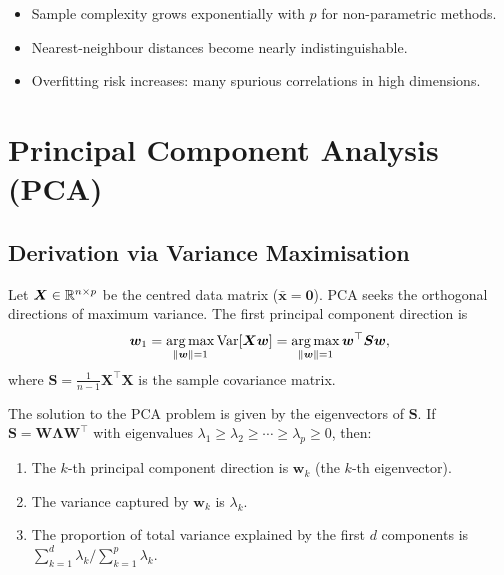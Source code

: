 \begin{warning}[title=\textbf{Practical Consequences}]
\begin{itemize}
  \item Sample complexity grows exponentially with $p$ for non-parametric methods.
  \item Nearest-neighbour distances become nearly indistinguishable.
  \item Overfitting risk increases: many spurious correlations in high dimensions.
\end{itemize}
\end{warning}

\section{Principal Component Analysis (PCA)}

\subsection{Derivation via Variance Maximisation}

\begin{definition}[PCA]
Let $\bm{X}\in\mathbb{R}^{n\times p}$ be the centred data matrix ($\bar{\bm{x}}=\bm{0}$). PCA seeks the orthogonal directions of maximum variance. The first principal component direction is
\[
  \bm{w}_1 = \operatorname*{arg\,max}_{\left\| \bm{w} \right\|=1} \mathrm{Var}[\bm{X}\bm{w}]
  = \operatorname*{arg\,max}_{\left\| \bm{w} \right\|=1} \bm{w}^\top\bm{S}\bm{w},
\]
where $\bm{S}=\frac{1}{n-1}\bm{X}^\top\bm{X}$ is the sample covariance matrix.
\end{definition}

\begin{theorem}
The solution to the PCA problem is given by the eigenvectors of $\bm{S}$. If $\bm{S}=\bm{W}\bm{\Lambda}\bm{W}^\top$ with eigenvalues $\lambda_1\geq\lambda_2\geq\cdots\geq\lambda_p\geq 0$, then:
\begin{enumerate}
  \item The $k$-th principal component direction is $\bm{w}_k$ (the $k$-th eigenvector).
  \item The variance captured by $\bm{w}_k$ is $\lambda_k$.
  \item The proportion of total variance explained by the first $d$ components is $\sum_{k=1}^d\lambda_k / \sum_{k=1}^p\lambda_k$.
\end{enumerate}
\end{theorem}


